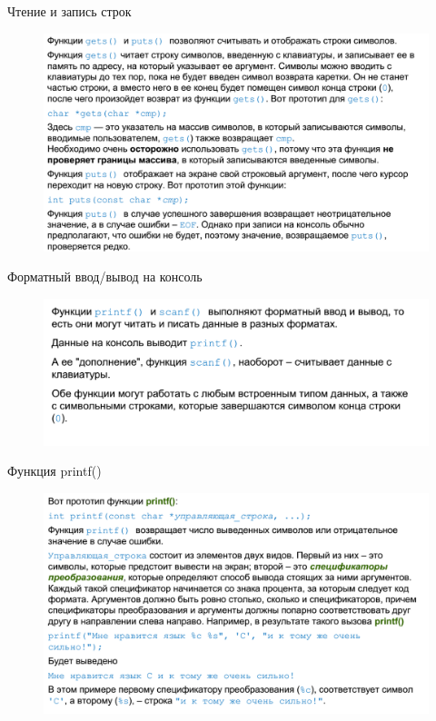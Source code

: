 \documentclass{beamer}
\begin{document}
\begin{frame}{Чтение и запись строк}
\begin{figure}[h]
\centering
\includegraphics[scale=0.4]{images/lec02-pic25.png}
\end{figure}
\end{frame}

\begin{frame}{Форматный ввод/вывод на консоль}
\begin{figure}[h]
\centering
\includegraphics[scale=0.4]{images/lec02-pic26.png}
\end{figure}
\end{frame}

\begin{frame}{Функция printf()}
\begin{figure}[h]
\centering
\includegraphics[scale=0.4]{images/lec02-pic27.png}
\end{figure}
\end{frame}
\end{document}
